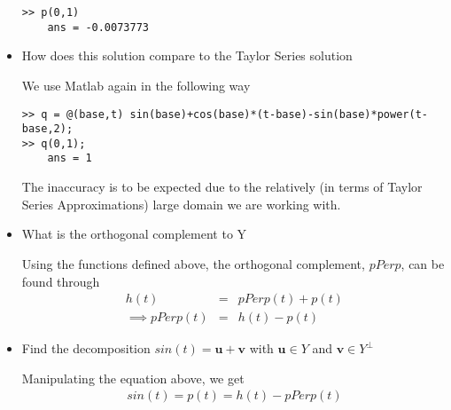 \documentclass[11pt]{SelfArxOneColBMN}
\begin{document}
\begin{exercise}
\begin{itemize}
\begin{solution}
\begin{lstlisting}
>> p(0,1)
    ans = -0.0073773
\end{lstlisting}
        \end{solution}
        \item How does this solution compare to the Taylor Series solution
        \begin{solution}
        We use Matlab again in the following way
\begin{lstlisting}
>> q = @(base,t) sin(base)+cos(base)*(t-base)-sin(base)*power(t-base,2);
>> q(0,1);
    ans = 1
\end{lstlisting}
            The inaccuracy is to be expected due to the relatively (in terms of Taylor Series Approximations) large domain we are working with.
        \end{solution}
        \item What is the orthogonal complement to Y
        \begin{solution}
            Using the functions defined above, the orthogonal complement, $pPerp$, can be found through
            \begin{eqnarray*}
                h(t) &=& pPerp(t) + p(t)\\
                \implies pPerp(t) &=& h(t) - p(t) 
            \end{eqnarray*}
        \end{solution}
        \item Find the decomposition $sin(t) = \mathbf{u} + \mathbf{v}$ with $\mathbf{u} \in Y$ and $\mathbf{v} \in Y^\perp$
        \begin{solution}
        Manipulating the equation above, we get
        \begin{eqnarray*}
            sin(t) = p(t) = h(t) - pPerp(t)
        \end{eqnarray*}
        \end{solution}
    \end{itemize}
\end{exercise}
\end{document}
